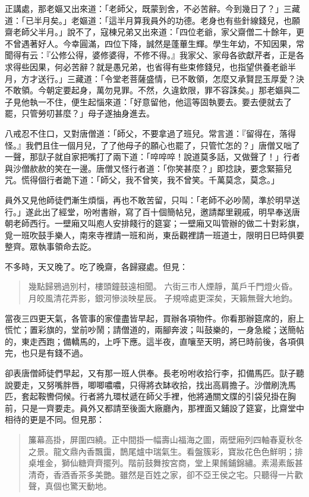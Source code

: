 正講處，那老嫗又出來道：「老師父，既蒙到舍，不必苦辭。今到幾日了？」三藏道：「已半月矣。」老嫗道：「這半月算我員外的功德。老身也有些針線錢兒，也願齋老師父半月。」說不了，寇棟兄弟又出來道：「四位老爺，家父齋僧二十餘年，更不曾遇著好人。今幸圓滿，四位下降，誠然是蓬蓽生輝。學生年幼，不知因果，常聞得有云：『公修公得，婆修婆得，不修不得。』我家父、家母各欲獻芹者，正是各求得些因果，何必苦辭？就是愚兄弟，也省得有些束修錢兒，也指望供養老爺半月，方才送行。」三藏道：「令堂老菩薩盛情，已不敢領，怎麼又承賢昆玉厚愛？決不敢領。今朝定要起身，萬勿見罪。不然，久違欽限，罪不容誅矣。」那老嫗與二子見他執一不住，便生起惱來道：「好意留他，他這等固執要去。要去便就去了罷，只管勞叨甚麼？」母子遂抽身進去。

八戒忍不住口，又對唐僧道：「師父，不要拿過了班兒。常言道：『留得在，落得怪。』我們且住一個月兒，了了他母子的願心也罷了，只管忙怎的？」唐僧又咄了一聲，那獃子就自家把嘴打了兩下道：「啐啐啐！說道莫多話，又做聲了！」行者與沙僧赥赥的笑在一邊。唐僧又怪行者道：「你笑甚麼？」即捻訣，要念緊箍兒咒。慌得個行者跪下道：「師父，我不曾笑，我不曾笑。千萬莫念，莫念。」

員外又見他師徒們漸生煩惱，再也不敢苦留，只叫：「老師不必吵鬧，準於明早送行。」遂此出了經堂，吩咐書辦，寫了百十個簡帖兒，邀請鄰里親戚，明早奉送唐朝老師西行。一壁廂又叫庖人安排餞行的筵宴；一壁廂又叫管辦的做二十對彩旗，覓一班吹鼓手樂人，南來寺裡請一班和尚，東岳觀裡請一班道士，限明日巳時俱要整齊。眾執事領命去訖。

不多時，天又晚了。吃了晚齋，各歸寢處。但見：
\begin{quote}
幾點歸鴉過別村，樓頭鐘鼓遠相聞。
六街三市人煙靜，萬戶千門燈火昏。
月皎風清花弄影，銀河慘淡映星辰。
子規啼處更深矣，天籟無聲大地鈞。
\end{quote}

當夜三四更天氣，各管事的家僮盡皆早起，買辦各項物件。你看那辦筵席的，廚上慌忙；置彩旗的，堂前吵鬧；請僧道的，兩腳奔波；叫鼓樂的，一身急縱；送簡帖的，東走西跑；備轎馬的，上呼下應。這半夜，直嚷至天明，將巳時前後，各項俱完，也只是有錢不過。

卻表唐僧師徒們早起，又有那一班人供奉。長老吩咐收拾行李，扣備馬匹。獃子聽說要走，又努嘴胖唇，唧唧噥噥，只得將衣缽收拾，找出高肩擔子。沙僧刷洗馬匹，套起鞍轡伺候。行者將九環杖遞在師父手裡，他將通關文牒的引袋兒掛在胸前，只是一齊要走。員外又都請至後面大廠廳內，那裡面又鋪設了筵宴，比齋堂中相待的更是不同。但見那：
\begin{quote}
簾幕高掛，屏圍四繞。正中間掛一幅壽山福海之圖，兩壁廂列四軸春夏秋冬之景。龍文鼎內香飄靄，鵲尾爐中瑞氣生。看盤簇彩，寶妝花色色鮮明；排桌堆金，獅仙糖齊齊擺列。階前鼓舞按宮商，堂上果餚鋪錦繡。素湯素飯甚清奇，香酒香茶多美艷。雖然是百姓之家，卻不亞王侯之宅。只聽得一片歡聲，真個也驚天動地。
\end{quote}

